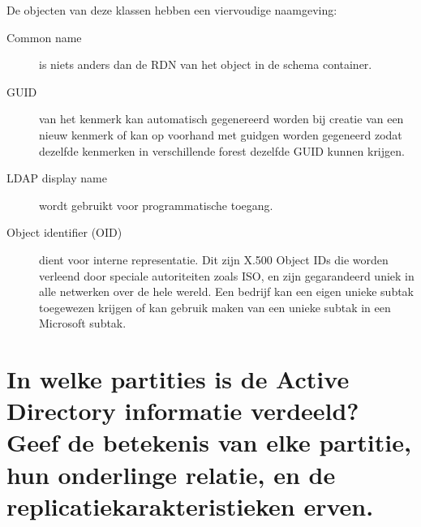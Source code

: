De objecten van deze klassen hebben een viervoudige naamgeving:
\begin{description}
	\item[Common name] is niets anders dan de RDN van het object in de
		schema container.
	\item[GUID] van het kenmerk kan automatisch gegenereerd worden bij
		creatie van een nieuw kenmerk of kan op voorhand met guidgen
		worden gegeneerd zodat dezelfde kenmerken in verschillende
		forest dezelfde GUID kunnen krijgen.
	\item[LDAP display name] wordt gebruikt voor programmatische toegang.
	\item[Object identifier (OID)] dient voor interne representatie. Dit
		zijn X.500 Object IDs die worden verleend door speciale
		autoriteiten zoals ISO, en zijn gegarandeerd uniek in alle
		netwerken over de hele wereld. Een bedrijf kan een eigen unieke
		subtak toegewezen krijgen of kan gebruik maken van een unieke
		subtak in een Microsoft subtak.
\end{description}

\section{In welke partities is de Active Directory informatie verdeeld? Geef de
betekenis van elke partitie, hun onderlinge relatie, en de
replicatiekarakteristieken erven.}

